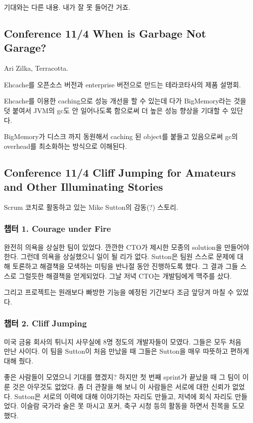 \documentclass[a4paper]{article}
\begin{document}
기대와는 다른 내용. 내가 잘 못 들어간 거죠.
 
\subsection{Conference 11/4 When is Garbage Not Garage?}
 
Ari Zilka, Terracotta.
 
Ehcache를 오픈소스 버전과 enterprise 버전으로 만드는 테라코타사의 제품 설명회.
 
Ehcache를 이용한 caching으로 성능 개선을 할 수 있는데 다가
BigMemory라는 것을 덧 붙여서 JVM의 gc도 안 일어나도록 함으로써 더 높은
성능 향상을 기대할 수 있단다.
 
BigMemory가 디스크 까지 동원해서 caching 된 object를 붙들고 있음으로써
gc의 overhead를 최소화하는 방식으로 이해된다.
 
\subsection{Conference 11/4 Cliff Jumping for Amateurs and Other
  Illuminating Stories}
 
Scrum 코치로 활동하고 있는 Mike Sutton의 감동(?) 스토리.
 
\subsubsection{챕터 1. Courage under Fire}
 
완전히 의욕을 상실한 팀이 있었다. 깐깐한 CTO가 제시한 모종의 solution을
만들어야 한다.  그런데 의욕을 상실했으니 일이 될 리가 없다. Sutton은
팀원 스스로 문제에 대해 토론하고 해결책을 모색하는 미팅을 반나절 동안
진행하도록 했다. 그 결과 그들 스스로 그럴듯한 해결책을 얻게되었다. 그날
저녁 CTO는 개발팀에게 맥주를 샀다.
 
그리고 프로젝트는 원래보다 빠방한 기능을 예정된 기간보다 조금 앞당겨 마칠 수 
있었다.
 
\subsubsection{챕터 2. Cliff Jumping}
 
미국 금융 회사의 튀니지 사무실에 8명 정도의 개발자들이 모였다. 그들은
모두 처음 만난 사이다.  이 팀을 Sutton이 처음 만났을 때 그들은 Sutton을
매우 따뜻하고 편하게 대해 줬다.
 
좋은 사람들이 모였으니 기대를 했겠지? 하지만 첫 번째 sprint가 끝났을 때
그 팀이 이룬 것은 아무것도 없었다. 좀 더 관찰을 해 보니 이 사람들은
서로에 대한 신뢰가 없었다. Sutton은 서로의 이력에 대해 이야기하는
자리도 만들고, 저녁에 회식 자리도 만들었다. 이슬람 국가라 술은 못
마시고 포커, 축구 시청 등의 활동을 하면서 친목을 도모했다.
 
\end{document}
